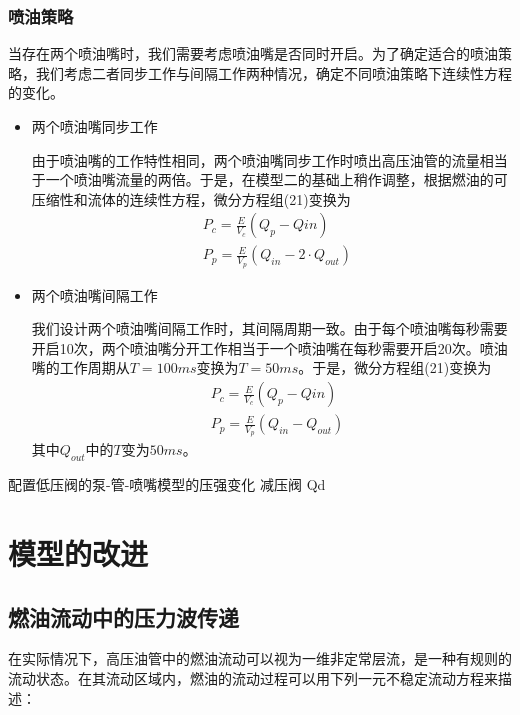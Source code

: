 \documentclass[withoutpreface,bwprint]{cumcmthesis} %
\begin{document}
			\subsubsection{喷油策略}
			当存在两个喷油嘴时，我们需要考虑喷油嘴是否同时开启。为了确定适合的喷油策略，我们考虑二者同步工作与间隔工作两种情况，确定不同喷油策略下连续性方程的变化。
			\begin{itemize}
				\item 两个喷油嘴同步工作
				
				由于喷油嘴的工作特性相同，两个喷油嘴同步工作时喷出高压油管的流量相当于一个喷油嘴流量的两倍。于是，在模型二的基础上稍作调整，根据燃油的可压缩性和流体的连续性方程，微分方程组(21)变换为
				\begin{equation}
				\begin{aligned}
				&P_c=\frac{E}{V_c}(Q_p-Q{in}) \\
				&P_p=\frac{E}{V_p}(Q_{in}-2\cdot Q_{out})
				\end{aligned}
				\end{equation}
				\item 两个喷油嘴间隔工作
				
				我们设计两个喷油嘴间隔工作时，其间隔周期一致。由于每个喷油嘴每秒需要开启10次，两个喷油嘴分开工作相当于一个喷油嘴在每秒需要开启20次。喷油嘴的工作周期从$T = 100ms$变换为$T = 50ms$。于是，微分方程组(21)变换为
				\begin{equation}
				\begin{aligned}
				&P_c=\frac{E}{V_c}(Q_p-Q{in}) \\
				&P_p=\frac{E}{V_p}(Q_{in}-Q_{out})
				\end{aligned}
				\end{equation}
				其中$Q_{out}$中的$T$变为$50ms$。
			\end{itemize}
			
			
			
			
			\subsubitem
			配置低压阀的泵­-管-­喷嘴模型的压强变化
			减压阀
			Qd
			
			\section{模型的改进}
			
			\subsection{燃油流动中的压力波传递}
			
			在实际情况下，高压油管中的燃油流动可以视为一维非定常层流，是一种有规则的流动状态。在其流动区域内，燃油的流动过程可以用下列一元不稳定流动方程\cite{bib:five}来描述：
			
\end{document}
